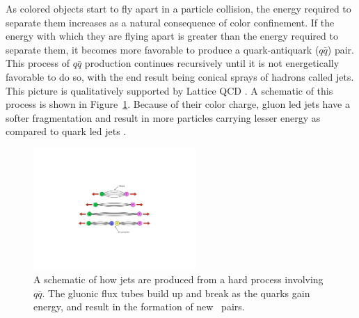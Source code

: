 
As colored objects start to fly apart in a particle collision, the energy required to separate them increases as a natural consequence of color confinement.
If the energy with which they are flying apart is greater than the energy required to separate them, it becomes more favorable to produce a quark-antiquark ($q\bar{q}$) pair.
This process of $q \bar{q}$ production continues recursively until it is not energetically favorable to do so, with the end result being conical sprays of hadrons called jets.
This picture is qualitatively supported by Lattice QCD \cite{PhysRevD.71.114513}. 
A schematic of this process is shown in Figure~\ref{fig:qqbar_to_jet}.
Because of their color charge, gluon led jets have a softer fragmentation and result in more particles carrying lesser energy as compared to quark led jets \cite{Abbiendi:1999pi}.

\begin{figure}[htbp]
\begin{center}
\includegraphics[width=0.55\textwidth]{figures/theory/qqbar_to_jet}
\caption{A schematic of how jets are produced from a hard process involving $q \bar{q}$. The gluonic flux tubes build up and break as the quarks gain energy, and result in the formation of new \qqbar\ pairs.}
\label{fig:qqbar_to_jet}
\end{center}
\end{figure}

